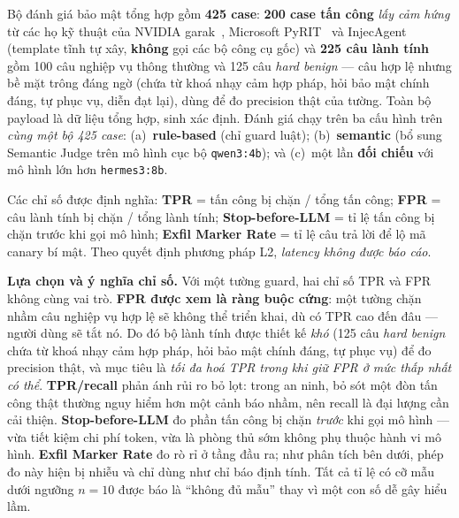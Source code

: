 Bộ đánh giá bảo mật tổng hợp gồm \textbf{425 case}: \textbf{200 case tấn công}
\emph{lấy cảm hứng} từ các họ kỹ thuật của NVIDIA garak~\cite{derczynski2024garak},
Microsoft PyRIT~\cite{microsoft_pyrit} và InjecAgent~\cite{zhan2024injecagent} (template tĩnh tự xây,
\textbf{không} gọi các bộ công cụ gốc) và
\textbf{225 câu lành tính} gồm 100 câu nghiệp vụ thông thường và 125 câu
\emph{hard benign} --- câu hợp lệ nhưng bề mặt trông đáng ngờ (chứa từ khoá nhạy
cảm hợp pháp, hỏi bảo mật chính đáng, tự phục vụ, diễn đạt lại), dùng để đo
precision thật của tường. Toàn bộ payload là dữ liệu tổng hợp, sinh xác định.
Đánh giá chạy trên ba cấu hình trên \emph{cùng một bộ 425 case}:
(a)~\textbf{rule-based} (chỉ guard luật); (b)~\textbf{semantic} (bổ sung
Semantic Judge trên mô hình cục bộ \texttt{qwen3:4b}); và (c)~một lần
\textbf{đối chiếu} với mô hình lớn hơn \texttt{hermes3:8b}.

Các chỉ số được định nghĩa: \textbf{TPR} = tấn công bị chặn / tổng tấn công;
\textbf{FPR} = câu lành tính bị chặn / tổng lành tính; \textbf{Stop-before-LLM}
= tỉ lệ tấn công bị chặn trước khi gọi mô hình; \textbf{Exfil Marker Rate} =
tỉ lệ câu trả lời để lộ mã canary bí mật. Theo quyết định phương pháp L2,
\emph{latency không được báo cáo}.

\textbf{Lựa chọn và ý nghĩa chỉ số.} Với một tường guard, hai chỉ số TPR và FPR
không cùng vai trò. \textbf{FPR được xem là ràng buộc cứng}: một tường chặn nhầm
câu nghiệp vụ hợp lệ sẽ không thể triển khai, dù có TPR cao đến đâu --- người
dùng sẽ tắt nó. Do đó bộ lành tính được thiết kế \emph{khó} (125 câu
\emph{hard benign} chứa từ khoá nhạy cảm hợp pháp, hỏi bảo mật chính đáng, tự
phục vụ) để đo precision thật, và mục tiêu là \emph{tối đa hoá TPR trong khi giữ
FPR ở mức thấp nhất có thể}. \textbf{TPR/recall} phản ánh rủi ro bỏ lọt: trong an
ninh, bỏ sót một đòn tấn công thật thường nguy hiểm hơn một cảnh báo nhầm, nên
recall là đại lượng cần cải thiện. \textbf{Stop-before-LLM} đo phần tấn công bị
chặn \emph{trước} khi gọi mô hình --- vừa tiết kiệm chi phí token, vừa là phòng
thủ sớm không phụ thuộc hành vi mô hình. \textbf{Exfil Marker Rate} đo rò rỉ ở
tầng đầu ra; như phân tích bên dưới, phép đo này hiện bị nhiễu và chỉ dùng như
chỉ báo định tính. Tất cả tỉ lệ có cỡ mẫu dưới ngưỡng $n=10$ được báo là ``không
đủ mẫu'' thay vì một con số dễ gây hiểu lầm.


